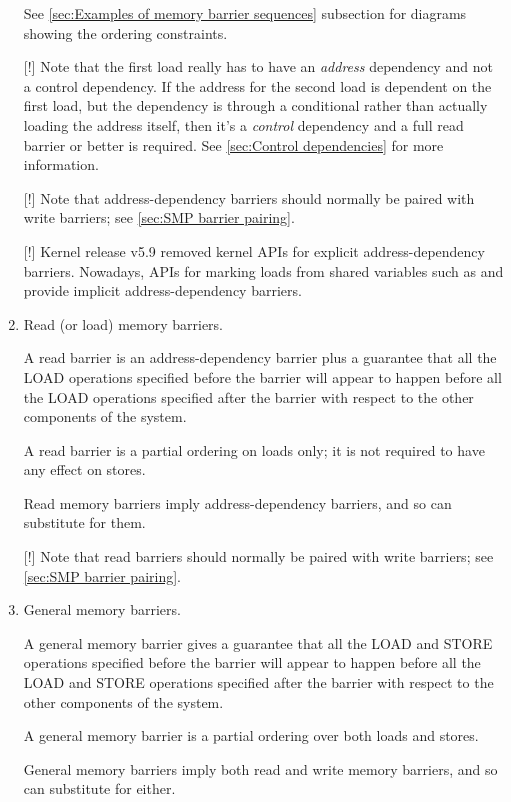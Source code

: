 \begin{enumerate}
     See \cref{sec:Examples of memory barrier sequences} subsection for diagrams
     showing the ordering constraints.

     [!] Note that the first load really has to have an \emph{address}
     dependency and not a control dependency.
     If the address for the second load is dependent on the first load,
     but the dependency is through a conditional rather than actually
     loading the address itself, then it's a \emph{control} dependency and
     a full read barrier or better is required.
     See \cref{sec:Control dependencies} for more information.

     [!] Note that address-dependency barriers should normally be paired with
     write barriers; see \cref{sec:SMP barrier pairing}.

     [!] Kernel release v5.9 removed kernel APIs for explicit
     address-dependency barriers.
     Nowadays, APIs for marking loads from shared variables such as
      and  provide implicit
     address-dependency barriers.

 \item
     Read (or load) memory barriers.

     A read barrier is an address-dependency barrier plus a guarantee that all
     the LOAD operations specified before the barrier will appear to happen
     before all the LOAD operations specified after the barrier with respect to
     the other components of the system.

     A read barrier is a partial ordering on loads only; it is not required to
     have any effect on stores.

     Read memory barriers imply address-dependency barriers, and so can
     substitute for them.

     [!] Note that read barriers should normally be paired with write barriers;
     see \cref{sec:SMP barrier pairing}.


 \item
     General memory barriers.

     A general memory barrier gives a guarantee that all the LOAD and STORE
     operations specified before the barrier will appear to happen before all
     the LOAD and STORE operations specified after the barrier with respect to
     the other components of the system.

     A general memory barrier is a partial ordering over both loads and stores.

     General memory barriers imply both read and write memory barriers, and so
     can substitute for either.
\end{enumerate}

